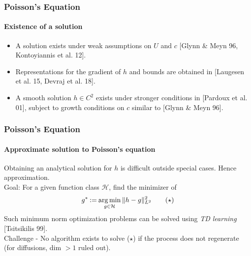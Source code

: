 \documentclass[xcolor=dvipsnames, subsection=false]{beamer}
\def\alertb#1{\alert{\color{BrickRed}  #1}}
\def\alertb#1{\alert{\color{BrickRed}  #1}}
\def\clH{{\mathcal H}}
\def\argmin{\mathop{\rm arg\, min}}
\def\eqdef{\mathbin{:=}}
\newcommand{\pot}{U}
\def\bl#1{{\color{blue}#1}}
\begin{document}
\begin{frame}
\frametitle{Poisson's Equation}
\framesubtitle{Existence of a solution}
\begin{itemize}
\item A solution exists under weak assumptions on $\pot$ and $c$ \bl{\footnotesize{[Glynn \& Meyn 96, Kontoyiannis et al. 12]}}.
\item Representations for the gradient of $h$ and bounds are obtained in \bl{\footnotesize{[Laugesen et al. 15, Devraj et al. 18]}}.
\item A smooth solution $h\in C^2$ exists under stronger conditions in \bl{\footnotesize{[Pardoux et al. 01]}}, subject to growth conditions on $c$ similar to \bl{\footnotesize{[Glynn \& Meyn 96]}}.
\end{itemize}
\end{frame}

\begin{frame}
\frametitle{Poisson's Equation}
\framesubtitle{Approximate solution to Poisson's equation}
Obtaining an analytical solution for $h$ is difficult outside special cases. Hence approximation.\\[0.5cm] \pause
Goal: For a given function class $\clH$, find the minimizer of
\[
g^* \eqdef \argmin_{g \in \clH} \|h - g\|^2_{L^2}  \tag{$\star$}
\label{e:lstd1}
\]
Such minimum norm optimization problems can be solved using \textit{TD learning} {\footnotesize \bl{[Tsitsikilis 99]}}.\\[0.5cm] \pause
\alertb{Challenge - No algorithm exists to solve ($\star$) if the process does not regenerate (for diffusions, dim $>1$ ruled out)}.
\end{frame}
\end{document}
